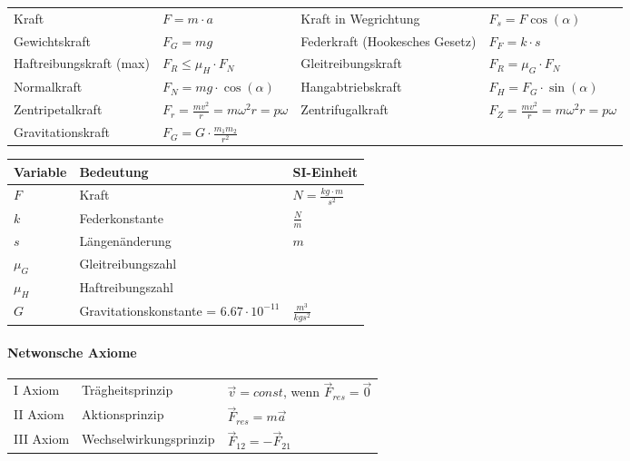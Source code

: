 \documentclass[
a4paper,
oneside,
landscape, 
8pt,
]{scrartcl}
\begin{document}
\begin{multicols*}{2}
\begin{tabbing}
	\begin{tabu} to \linewidth {X l X l}
		\toprule
		Kraft & $F = m \cdot a$ & 
		Kraft in Wegrichtung & $F_s = F \cos(\alpha)$ \\
		Gewichtskraft & $F_G = mg$  &
		Federkraft (Hookesches Gesetz) & $F_F = k\cdot s$ \\
		Haftreibungskraft (max) & $F_R \leq \mu_H \cdot F_N$ &
		Gleitreibungskraft & $F_R = \mu_G \cdot F_N$ \\
		Normalkraft & $F_N = mg\cdot \cos(\alpha)$ &
		Hangabtriebskraft & $F_H = F_G \cdot \sin(\alpha)$  \\
		Zentripetalkraft & $F_r = \frac{mv^2}{r} = m\omega^2r = p\omega$ & 
		Zentrifugalkraft & $F_Z = \frac{mv^2}{r} = m\omega^2r = p\omega$ \\
		Gravitationskraft & $F_G = G \cdot \frac{m_1m_2}{r^2}$
	\end{tabu}
\end{tabbing}

\begin{tabbing}
	\begin{tabu} to \linewidth {l X l}
		Variable & Bedeutung & SI-Einheit \\
		\midrule
		$F$ & Kraft & $N = \frac{kg \cdot m}{s^2}$\\ 
		$k$ & Federkonstante & $\frac{N}{m}$ \\
		$s$ & Längenänderung & $m$ \\
		$\mu_G$ & Gleitreibungszahl &  \\
		$\mu_H$ & Haftreibungszahl &  \\
		$G$ & Gravitationskonstante = $6.67 \cdot 10^{-11}$ & $\frac{m^3}{kg s^2}$ \\
		\bottomrule
	\end{tabu}
\end{tabbing}

\paragraph{Netwonsche Axiome}

\begin{tabbing}
	\begin{tabu} to \linewidth {l l X}
		\toprule
		I Axiom & Trägheitsprinzip & $\vec{v} = const$, wenn $ \vec{F}_{res} = \vec{0}$ \\
		II Axiom & Aktionsprinzip & $\vec{F}_{res} = m\vec{a}$\\ 
		III Axiom & Wechselwirkungsprinzip & $\vec{F}_{12} = - \vec{F}_{21}$ \\
		\bottomrule
	\end{tabu}
\end{tabbing}



\end{multicols*}
\end{document}
